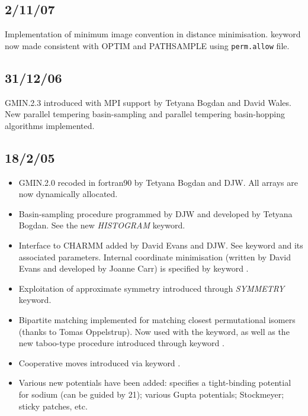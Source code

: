 {\subsection{2/11/07}
Implementation of minimum image convention in distance minimisation.
{} keyword now made consistent with OPTIM and PATHSAMPLE
using {\tt perm.allow} file.

\subsection{31/12/06}
GMIN.2.3 introduced with MPI support by Tetyana Bogdan and David Wales.
New parallel tempering basin-sampling and
parallel tempering basin-hopping algorithms implemented.

\subsection{18/2/05}
\begin{itemize}
\item GMIN.2.0 recoded in fortran90 by Tetyana Bogdan and DJW. All arrays are now dynamically allocated.
\item Basin-sampling procedure programmed by DJW and developed by Tetyana Bogdan. See the new
{\it HISTOGRAM} keyword.
\item Interface to CHARMM added by David Evans and DJW. See keyword {} and its associated 
parameters. Internal coordinate minimisation (written by David Evans and developed by Joanne Carr) 
is specified by keyword {}.
\item Exploitation of approximate symmetry introduced through {\it SYMMETRY} keyword.
\item Bipartite matching implemented for matching closest permutational isomers
(thanks to Tomas Oppelstrup). Now used with 
the {} keyword, as well as the new taboo-type procedure introduced through keyword {}.
\item Cooperative moves introduced via keyword {}.
\item Various new potentials have been added: {} specifies a tight-binding potential
for sodium (can be guided by { 21}); various Gupta potentials; Stockmeyer; sticky patches, etc.
\end{itemize}

}
